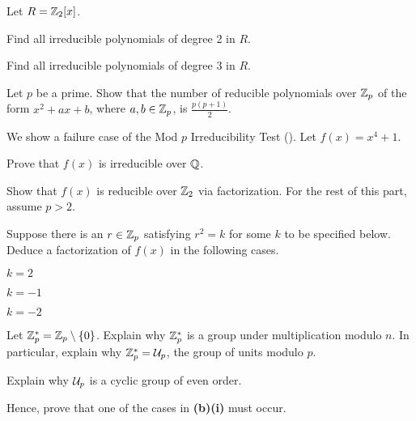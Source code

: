 \begin{problem}
    Let $R = \mathbb{Z}_2[x]$.
    \begin{partquestions}{\alph*}
        \item Find all irreducible polynomials of degree 2 in $R$.
        \item Find all irreducible polynomials of degree 3 in $R$.
    \end{partquestions}
\end{problem}

\begin{problem}
    Let $p$ be a prime. Show that the number of reducible polynomials over $\mathbb{Z}_p$ of the form $x^2 + ax + b$, where $a,b \in \mathbb{Z}_p$, is $\frac{p(p+1)}2$.
\end{problem}

\begin{problem}
    We show a failure case of the Mod $p$ Irreducibility Test (). Let $f(x) = x^4 + 1$.
    \begin{partquestions}{\alph*}
        \item Prove that $f(x)$ is irreducible over $\mathbb{Q}$.
        \item Show that $f(x)$ is reducible over $\mathbb{Z}_2$ via factorization.\newline
        For the rest of this part, assume $p > 2$.
        \begin{partquestions}{\roman*}
            \item Suppose there is an $r \in \mathbb{Z}_p$ satisfying $r^2 = k$ for some $k$ to be specified below. Deduce a factorization of $f(x)$ in the following cases.
            \begin{partquestions}{\alph*}
                \item $k = 2$
                \item $k = -1$
                \item $k = -2$
            \end{partquestions}
            \item Let $\mathbb{Z}_p^\ast = \mathbb{Z}_p \setminus \{0\}$. Explain why $\mathbb{Z}_p^\ast$ is a group under multiplication modulo $n$. In particular, explain why $\mathbb{Z}_p^\ast = \mathcal{U}_{p}$, the group of units modulo $p$.
            \item Explain why $\mathcal{U}_{p}$ is a cyclic group of even order.
            \item Hence, prove that one of the cases in \textbf{(b)(i)} must occur.
        \end{partquestions}
    \end{partquestions}
\end{problem}
